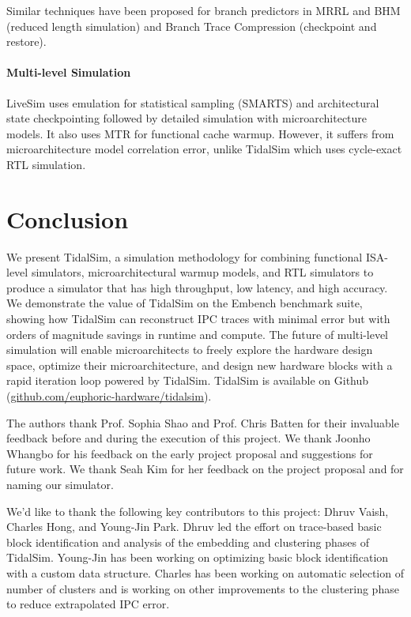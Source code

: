 \documentclass[sigplan,nonacm,10pt]{acmart}
\begin{document}
Similar techniques have been proposed for branch predictors in MRRL and BHM \cite{kluyskens2007branch} (reduced length simulation) and Branch Trace Compression \cite{barr2006branch} (checkpoint and restore).

\paragraph{Multi-level Simulation} LiveSim \cite{hassani2016livesim} uses emulation for statistical sampling (SMARTS) and architectural state checkpointing followed by detailed simulation with microarchitecture models. It also uses MTR for functional cache warmup. However, it suffers from microarchitecture model correlation error, unlike TidalSim which uses cycle-exact RTL simulation.

\section{Conclusion}

We present TidalSim, a simulation methodology for combining functional ISA-level simulators, microarchitectural warmup models, and RTL simulators to produce a simulator that has high throughput, low latency, and high accuracy.
We demonstrate the value of TidalSim on the Embench benchmark suite, showing how TidalSim can reconstruct IPC traces with minimal error but with orders of magnitude savings in runtime and compute.
The future of multi-level simulation will enable microarchitects to freely explore the hardware design space, optimize their microarchitecture, and design new hardware blocks with a rapid iteration loop powered by TidalSim.
TidalSim is available on Github (\href{https://github.com/euphoric-hardware/tidalsim}{github.com/euphoric-hardware/tidalsim}).

\begin{acks}

  The authors thank Prof. Sophia Shao and Prof. Chris Batten for their invaluable feedback before and during the execution of this project.
We thank Joonho Whangbo for his feedback on the early project proposal and suggestions for future work.
We thank Seah Kim for her feedback on the project proposal and for naming our simulator.
  
  We'd like to thank the following key contributors to this project: Dhruv Vaish, Charles Hong, and Young-Jin Park. 
Dhruv led the effort on trace-based basic block identification and analysis of the embedding and clustering phases of TidalSim. 
Young-Jin has been working on optimizing basic block identification with a custom data structure. 
Charles has been working on automatic selection of number of clusters and is working on other improvements to the clustering phase to reduce extrapolated IPC error.

\end{acks}




\end{document}
